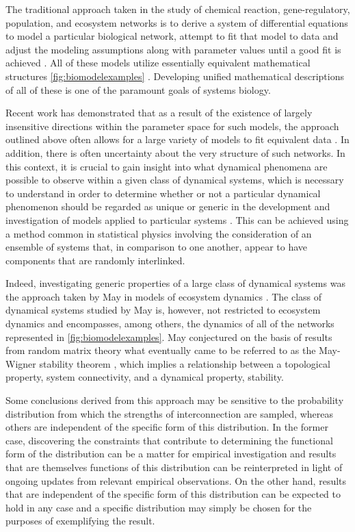The traditional approach taken in the study of chemical reaction, gene-regulatory, population, and ecosystem networks is to derive a system of differential equations to model a particular biological network, attempt to fit that model to data and adjust the modeling assumptions along with parameter values until a good fit is achieved \cite{Meyer2014}. All of these models utilize essentially equivalent mathematical structures \ref{fig:biomodelexamples} \cite{RossCr2003,Alon2006,Palsson2006,HamidBolouri2008,Palsson2011a,Voit2012,Sauro2012}. Developing unified mathematical descriptions of all of these is one of the paramount goals of systems biology.

Recent work has demonstrated that as a result of the existence of largely insensitive directions within the parameter space for such models, the approach outlined above often allows for a large variety of models to fit equivalent data \cite{Brown2003,Gutenkunst2007,Daniels2008a,Machta2013,Hines2014,Prabakaran2014,Tonsing2014}. In addition, there is often uncertainty about the very structure of such networks. In this context, it is crucial to gain insight into what dynamical phenomena are possible to observe within a given class of dynamical systems, which is necessary to understand in order to determine whether or not a particular dynamical phenomenon should be regarded as unique or generic in the development and investigation of models applied to particular systems \cite{Gunawardena2013,Gunawardena2014}. This can be achieved using a method common in statistical physics involving the consideration of an ensemble of systems that, in comparison to one another, appear to have components that are randomly interlinked.

Indeed, investigating generic properties of a large class of dynamical systems was the approach taken by May in models of ecosystem dynamics \cite{Gardner1970,May1972}. The class of dynamical systems studied by May is, however, not restricted to ecosystem dynamics and encompasses, among others, the dynamics of all of the networks represented in \ref{fig:biomodelexamples}. May conjectured on the basis of results from random matrix theory what eventually came to be referred to as the May-Wigner stability theorem \cite{Cohen1984,May1972a,Radius2014,Majumdar2014}, which implies a relationship between a topological property, system connectivity, and a dynamical property, stability.

Some conclusions derived from this approach may be sensitive to the probability distribution from which the strengths of interconnection are sampled, whereas others are independent of the specific form of this distribution. In the former case, discovering the constraints that contribute to determining the functional form of the distribution can be a matter for empirical investigation and results that are themselves functions of this distribution can be reinterpreted in light of ongoing updates from relevant empirical observations. On the other hand, results that are independent of the specific form of this distribution can be expected to hold in any case and a specific distribution may simply be chosen for the purposes of exemplifying the result.

